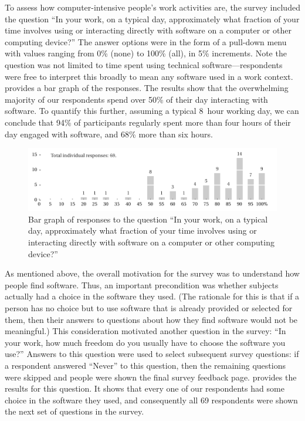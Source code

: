 \documentclass{casicswhitepaper}
\newcommand{\totalRespondents}{69\xspace}
\begin{document}
To assess how computer-intensive people's work activities are, the survey included the question ``In your work, on a typical day, approximately what fraction of your time involves using or interacting directly with software on a computer or other computing device?''  The answer options were in the form of a pull-down menu with values ranging from 0\% (none) to 100\% (all), in 5\% increments.  Note the question was not limited to time spent using technical software---respondents were free to interpret this broadly to mean any software used in a work context.   provides a bar graph of the responses.  The results show that the overwhelming majority of our respondents spend over 50\% of their day interacting with software.  To quantify this further, assuming a typical 8~hour working day, we can conclude that 94\% of participants regularly spent more than four hours of their day engaged with software, and 68\% more than six hours.

\begin{figure}[bth]
  \centering
  \includegraphics{files/plots/bar-graph-time-spent-with-software.pdf}
  \vspace*{-4.5ex}
  \caption{Bar graph of responses to the question ``In your work, on a
    typical day, approximately what fraction of your time involves using or
    interacting directly with software on a computer or other computing
    device?''}
  \label{time-with-software}
\end{figure}

As mentioned above, the overall motivation for the survey was to understand how people find software.  Thus, an important precondition was whether subjects actually had a choice in the software they used.  (The rationale for this is that if a person has no choice but to use software that is already provided or selected for them, then their answers to questions about how they find software would not be meaningful.)  This consideration motivated another question in the survey: ``In your work, how much freedom do you usually have to choose the software you use?''   Answers to this question were used to select subsequent survey questions: if a respondent answered ``Never'' to this question, then the remaining questions were skipped and people were shown the final survey feedback page.   provides the results for this question.  It shows that every one of our respondents had some choice in the software they used, and consequently all \totalRespondents respondents were shown the next set of questions in the survey.  %
\end{document}
